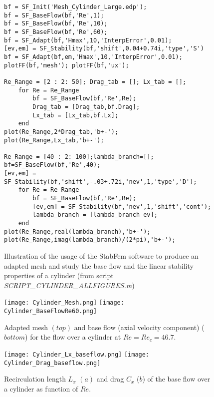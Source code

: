 \documentclass[twocolumn,10pt]{asme2ej}
\begin{document}
\begin{figure*}[t]
\small
\begin{lstlisting}
bf = SF_Init('Mesh_Cylinder_Large.edp');
bf = SF_BaseFlow(bf,'Re',1);
bf = SF_BaseFlow(bf,'Re',10);
bf = SF_BaseFlow(bf,'Re',60);
bf = SF_Adapt(bf,'Hmax',10,'InterpError',0.01);
[ev,em] = SF_Stability(bf,'shift',0.04+0.74i,'type','S')
bf = SF_Adapt(bf,em,'Hmax',10,'InterpError',0.01);
plotFF(bf,'mesh'); plotFF(bf,'ux');

Re_Range = [2 : 2: 50]; Drag_tab = []; Lx_tab = [];
    for Re = Re_Range
        bf = SF_BaseFlow(bf,'Re',Re);
        Drag_tab = [Drag_tab,bf.Drag];
        Lx_tab = [Lx_tab,bf.Lx];
    end
plot(Re_Range,2*Drag_tab,'b+-');
plot(Re_Range,Lx_tab,'b+-');

Re_Range = [40 : 2: 100];lambda_branch=[];
bf=SF_BaseFlow(bf,'Re',40);
[ev,em] = SF_Stability(bf,'shift',-.03+.72i,'nev',1,'type','D');
    for Re = Re_Range
        bf = SF_BaseFlow(bf,'Re',Re);
        [ev,em] = SF_Stability(bf,'nev',1,'shift','cont');
        lambda_branch = [lambda_branch ev];
    end
plot(Re_Range,real(lambda_branch),'b+-');
plot(Re_Range,imag(lambda_branch)/(2*pi),'b+-');
\end{lstlisting}
\normalsize
\caption{Illustration of the usage of the StabFem software to produce an adapted mesh and study the base flow and the linear stability properties of a cylinder
(from script {\em SCRIPT\_CYLINDER\_ALLFIGURES.m})}
\label{Listing2}
\end{figure*}


\begin{figure}
\texttt{[image: Cylinder\_Mesh.png]}
\texttt{[image: Cylinder\_BaseFlowRe60.png]}
\caption{Adapted mesh $(top)$  and base flow (axial velocity component) ($bottom$) for the flow over a cylinder at $Re=Re_c = 46.7$.}
\label{fig:Baseflow}
\end{figure}

\begin{figure}
\texttt{[image: Cylinder\_Lx\_baseflow.png]}
\texttt{[image: Cylinder\_Drag\_baseflow.png]}
\caption{Recirculation length $L_x$ $(a)$  and drag $C_x$ ($b$) of the base flow over a cylinder as function of $Re$.}
\label{fig:LxandDrag}
\end{figure}
\end{document}
